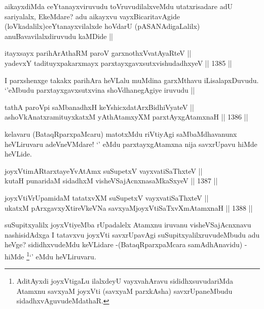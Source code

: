 \begin{artha}
aikayxdiMda ceYtanayxviruvudu toVruvudilalxveMdu utatxrisadare adU sariyalalx, EkeMdare? adu aikayxvu vayxBicaritavAgide (loVkadalilx)ceYtanayxvilalxde hoVdarU (pASANAdigaLalilx) anuBavavilalxdiruvudu kaMDide ||
\end{artha}


\begin{shl}
itayxsayx parihArAthaRM paroV garxnothxV\s vatAyaRteV || \\
yadevxY tadituyxpakarxmayx parxtayxgavxsutxvishudadhxyeV ||  1385 ||  
\end{shl}


\begin{artha}
I parxshenxge takakx parihAra heVLalu muMdina garxMthavu iLisalapxDuvudu. `\stext'eMbudu parxtayxgavxsutxvina shoVdhanegAgiye iruvudu ||
\end{artha}


\begin{shl}
tathA paroV\s pi saMbanadhxH keYshicxdatArxBidhiVyateV || \\
ashoVkAnatxramituyxkatxM yAthAtamxyXM parxtAyxgAtamxnaH ||  1386 ||  
\end{shl}

\begin{artha}
kelavaru (BataqRparxpaMcaru) matotxMdu riVtiyAgi saMbaMdhavanunx heVLiruvaru adeVneVMdare! `\stext' eMdu parxtayxgAtamxna nija savxrUpavu hiMde heVLide.
\end{artha}


\begin{shl}
joyxVtimARtarxtayeYvA\s \s tAmx suSupetxV vayxvatiSaThxteV ||  \\
kutaH punaridaM sidadhxM visheVSajAcnxnasaMkaSxyeV ||  1387 ||  
\end{shl}
				
\begin{shl}
joyxVtiVrUpamidaM tatatxvXM suSupetxV vayxvatiSaThxteV || \\
ukatxM pArxgavxyXtireVkeVNa savxyaMjoyxVtiSaTxvXmAtamxnaH ||  1388 ||  
\end{shl}

\begin{artha}
suSupitxyalilx joyxVtiyeMba rUpadalelx Atamxnu iruvanu visheVSajAcnxnavu nashisidAdxga I tatavxvu joyxVti savxrUpavAgi suSupitxyalilxruvudeMbudu adu heVge? sididhxvudeMdu keVLidare -(BataqRparxpaMcara samAdhAnavidu) - hiMde \footnote{AditAyxdi joyxVtigaLu ilalxdeyU vayxvahAravu sididhxsuvudariMda Atamxnu savxyaM joyxVti (savxyaM parxkAsha) savxrUpaneMbudu sidadhxvAguvudeMdathaR.}`\stext' eMdu heVLiruvaru.
\end{artha}


